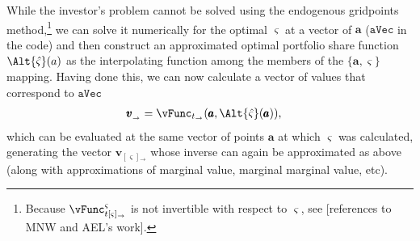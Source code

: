 While the investor's problem cannot be solved using the endogenous gridpoints method,\footnote{Because $\vFunc^{\varsigma}_{t[\varsigma]_\rightarrow}$ is not invertible with respect to $\varsigma$, see [references to MNW and AEL's work].} we can solve it numerically for the optimal $\varsigma$ at a vector of $\pmb{a}$ ({\ensuremath{\mathtt{aVec}}} in the code)  and then construct an approximated optimal portfolio share function $\Alt{\hat{\varsigma}}(a)$ as the interpolating function among the members of the $\{\pmb{a},\pmb{\varsigma}\}$ mapping.  Having done this, we can now calculate a vector of values that correspond to $\texttt{aVec}$
\begin{equation}\begin{gathered}\begin{aligned}
      \pmb{{v}}_{_\rightarrow}  & = \vFunc_{t_\rightarrow}(\pmb{a},\Alt{\hat{\varsigma}}(\pmb{a})), \label{eq:vShrEnd}
    \end{aligned}\end{gathered}\end{equation}
which can be evaluated at the same vector of points $\pmb{a}$ at which $\pmb{\varsigma}$ was calculated, generating the vector $\pmb{{v}}_{[\varsigma]{_\rightarrow}}$ whose inverse can again be approximated as above (along with approximations of marginal value, marginal marginal value, etc).%

